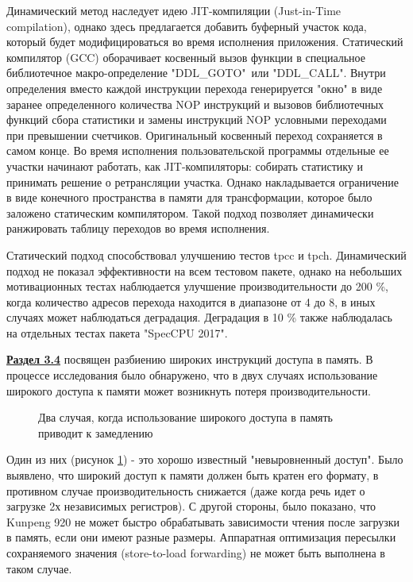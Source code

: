  
 Динамический метод наследует идею JIT-компиляции (Just-in-Time
 compilation), однако здесь предлагается
 добавить буферный участок кода, который будет модифицироваться во время исполнения приложения.
 Статический компилятор (GCC)  оборачивает косвенный вызов функции в специальное библиотечное макро-определение  "DDL\_GOTO"\  или "DDL\_CALL". Внутри определения вместо каждой инструкции
 перехода генерируется "окно"\phantom{} в виде заранее определенного
 количества NOP инструкций и вызовов библиотечных функций сбора
 статистики и замены инструкций NOP условными переходами при
 превышении счетчиков. Оригинальный косвенный переход
 сохраняется в самом конце. Во время исполнения пользовательской  программы отдельные ее участки начинают работать, как JIT-компиляторы: собирать статистику и принимать решение о ретрансляции участка. Однако накладывается ограничение в виде конечного пространства в памяти для трансформации, которое было заложено статическим компилятором. Такой подход позволяет динамически ранжировать таблицу переходов во время исполнения.
 
 Статический подход способствовал улучшению тестов tpcc и tpch. Динамический подход не показал эффективности на всем тестовом пакете, однако на небольших мотивационных тестах  наблюдается улучшение производительности до 200 \%, когда количество адресов перехода
 находится в диапазоне от 4 до 8, в иных случаях может наблюдаться деградация.
 Деградация в 10 \% также наблюдалась на отдельных тестах пакета
 "SpecCPU 2017"\phantom{}.
 
\underline{\textbf{Раздел 3.4}} посвящен разбиению широких инструкций доступа в память. В процессе исследования было обнаружено, что в двух случаях использование широкого доступа к памяти может
возникнуть потеря производительности. 
\begin{figure}[htbp]
	\centering
	
	\caption{Два случая, когда использование широкого доступа в память приводит к замедлению}
	\label{splitsvg1}
\end{figure}


Один из них (рисунок \ref{splitsvg1}) - это хорошо известный "невыровненный доступ". Было выявлено, что широкий доступ к памяти должен быть кратен его формату, в противном случае производительность снижается (даже когда речь идет о загрузке 2х независимых регистров). С другой стороны, было показано, что Kunpeng 920 не может быстро обрабатывать зависимости чтения после загрузки в память, если они имеют разные размеры. Аппаратная оптимизация пересылки сохраняемого значения (store-to-load forwarding) не может быть выполнена в таком случае.

